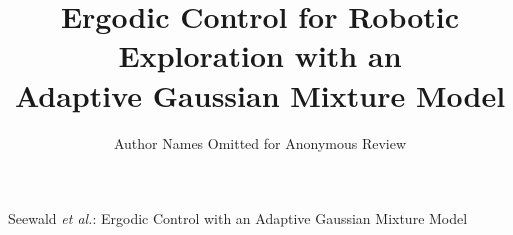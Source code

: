 \documentclass[letterpaper, 10 pt, conference, twoside]{IEEEtran}
\theoremstyle{definition}
\begin{document}

\title{\LARGE\bf Ergodic Control for Robotic Exploration with an\\Adaptive Gaussian Mixture Model}

\author{Author Names Omitted for Anonymous Review%

}

{Seewald \MakeLowercase{\textit{et al.}}: Ergodic Control with an Adaptive Gaussian Mixture Model}

\maketitle
\end{document}
